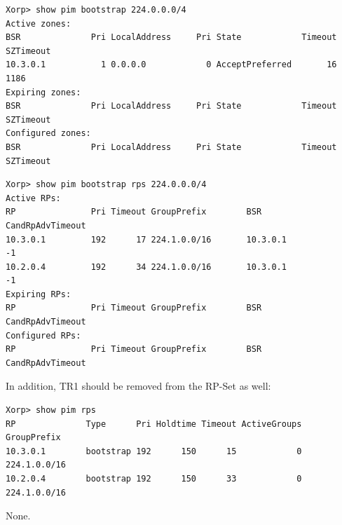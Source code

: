 \documentclass[11pt]{report}
\begin{document}
\begin{itemize}
\begin{verbatim}
Xorp> show pim bootstrap 224.0.0.0/4
Active zones:
BSR              Pri LocalAddress     Pri State            Timeout SZTimeout
10.3.0.1           1 0.0.0.0            0 AcceptPreferred       16      1186
Expiring zones:
BSR              Pri LocalAddress     Pri State            Timeout SZTimeout
Configured zones:
BSR              Pri LocalAddress     Pri State            Timeout SZTimeout
\end{verbatim}

\begin{verbatim}
Xorp> show pim bootstrap rps 224.0.0.0/4
Active RPs:
RP               Pri Timeout GroupPrefix        BSR         CandRpAdvTimeout
10.3.0.1         192      17 224.1.0.0/16       10.3.0.1                  -1
10.2.0.4         192      34 224.1.0.0/16       10.3.0.1                  -1
Expiring RPs:
RP               Pri Timeout GroupPrefix        BSR         CandRpAdvTimeout
Configured RPs:
RP               Pri Timeout GroupPrefix        BSR         CandRpAdvTimeout
\end{verbatim}

  In addition, TR1 should be removed from the RP-Set as well:

\begin{verbatim}
Xorp> show pim rps 
RP              Type      Pri Holdtime Timeout ActiveGroups GroupPrefix       
10.3.0.1        bootstrap 192      150      15            0 224.1.0.0/16      
10.2.0.4        bootstrap 192      150      33            0 224.1.0.0/16      
\end{verbatim}

\end{itemize}

None.

\end{document}
